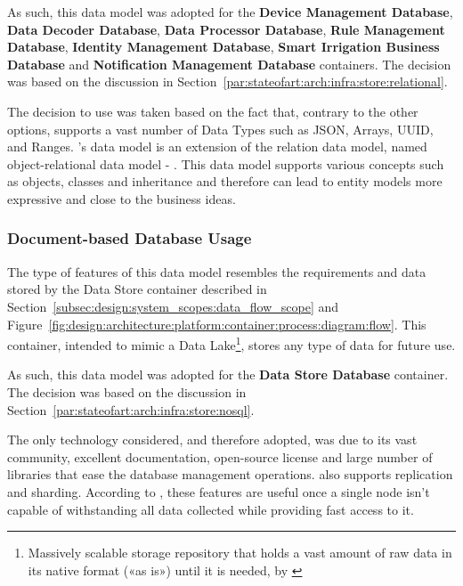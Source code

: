 As such, this data model was adopted for the \textbf{Device Management Database}, \textbf{Data Decoder Database}, \textbf{Data Processor Database}, \textbf{Rule Management Database}, \textbf{Identity Management Database}, \textbf{Smart Irrigation Business Database} and \textbf{Notification Management Database} containers. The decision was based on the discussion in Section~\ref{par:stateofart:arch:infra:store:relational}.

The decision to use  was taken based on the fact that, contrary to the other options,  supports a vast number of Data Types such as \gls{JSON}, Arrays, \gls{UUID}, and Ranges. 's data model is an extension of the relation data model, named object-relational data model - \cite{elmasri2000fundamentals}. This data model supports various concepts such as objects, classes and inheritance and therefore can lead to entity models more expressive and close to the business ideas.

\subsubsection{Document-based Database Usage}
\label{subsubsec:implementation:decisions:database:nosql}

The type of features of this data model resembles the requirements and data stored by the Data Store container described in Section~\ref{subsec:design:system_scopes:data_flow_scope} and Figure~\ref{fig:design:architecture:platform:container:process:diagram:flow}. This container, intended to mimic a Data Lake\footnote{Massively scalable storage repository that holds a vast amount of raw data in its native format («as is») until it is needed, by \cite{miloslavskaya2016big}}, stores any type of data for future use.

As such, this data model was adopted for the \textbf{Data Store Database} container. The decision was based on the discussion in Section~\ref{par:stateofart:arch:infra:store:nosql}.

The only technology considered, and therefore adopted, was  due to its vast community, excellent documentation, open-source license and large number of libraries that ease the database management operations.  also supports replication and sharding. According to \cite{elmasri2000fundamentals}, these features are useful once a single node isn't capable of withstanding all data collected while providing fast access to it.

